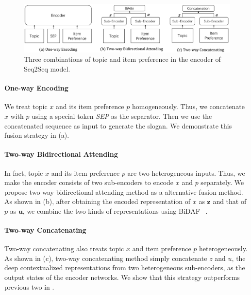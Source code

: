 \begin{figure}[th!]
	\centering
	\includegraphics[width=1.8\columnwidth]{figures/enc}
	\caption{Three combinations of topic and item preference in the encoder of Seq2Seq model.}
	\label{fig:enc}
\end{figure}


\paragraph{One-way Encoding}
We treat topic $x$ and its item preference $p$ homogeneously.
Thus, we concatenate $x$ with $p$ using a special token \emph{SEP} as the separator. Then we use the concatenated sequence as input to generate the 
slogan.
We demonstrate this fusion strategy in  (a).


\paragraph{Two-way Bidirectional Attending}
In fact, topic $x$ and its item preference $p$ are two heterogeneous inputs. Thus, we make the encoder consists of two sub-encoders to 
encode $x$ and $p$ separately.
We propose two-way bidirectional attending method as 
a alternative fusion method.
As shown in  (b), after obtaining the encoded representation of $x$ as $\textbf{z}$ and that of $p$ as $\textbf{u}$, we combine the two kinds of representations using BiDAF ~\cite{seo2016bidirectional}.

\paragraph{Two-way Concatenating}
Two-way concatenating also treats topic $x$ and item preference $p$ heterogeneously.
As shown in  (c),
two-way concatenating method simply concatenate $z$ and $u$, the deep contextualized representations from two heterogeneous sub-encoders, as the output states of the encoder networks.
We show that this strategy outperforms previous two in .

